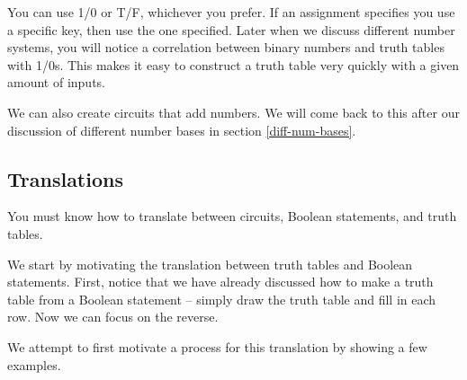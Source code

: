 \documentclass[main.tex]{subfiles}
\begin{document}
You can use 1/0 or T/F, whichever you prefer. If an assignment specifies you use a specific key, then use the one specified. Later when we discuss different number systems, you will notice a correlation between binary numbers and truth tables with 1/0s. This makes it easy to construct a truth table very quickly with a given amount of inputs.

We can also create circuits that add numbers. We will come back to this after our discussion of different number bases in section \ref{diff-num-bases}.

\subsection{Translations}

You must know how to translate between circuits, Boolean statements, and truth tables.

We start by motivating the translation between truth tables and Boolean statements. First, notice that we have already discussed how to make a truth table from a Boolean statement -- simply draw the truth table and fill in each row. Now we can focus on the reverse.

We attempt to first motivate a process for this translation by showing a few examples.
\end{document}
